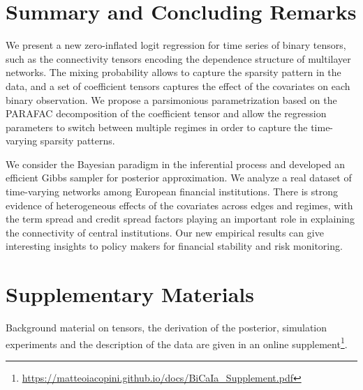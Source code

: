 \documentclass[12pt,a4paper]{article}
\theoremstyle{custom}
\begin{document}
\section{Summary and Concluding Remarks} \label{sec:conclusions}
We present a new zero-inflated logit regression for time series of binary tensors, such as the connectivity tensors encoding the dependence structure of multilayer networks.
The mixing probability allows to capture the sparsity pattern in the data, and a set of coefficient tensors captures the effect of the covariates on each binary observation.
We propose a parsimonious parametrization based on the PARAFAC decomposition of the coefficient tensor and allow the regression parameters to switch between multiple regimes in order to capture the time-varying sparsity patterns. 

We consider the Bayesian paradigm in the inferential process and developed an efficient Gibbs sampler for posterior approximation.
We analyze a real dataset of time-varying networks among European financial institutions. There is strong evidence of heterogeneous effects of the covariates across edges and regimes, with the term spread and credit spread factors playing an important role in explaining the connectivity of central institutions.
Our new empirical results can give interesting insights to policy makers for financial stability and risk monitoring.





\section*{Supplementary Materials}
Background material on tensors, the derivation of the posterior, simulation experiments and the description of the data are given in an online supplement\footnote{\url{https://matteoiacopini.github.io/docs/BiCaIa_Supplement.pdf}}.




%
\end{document}
